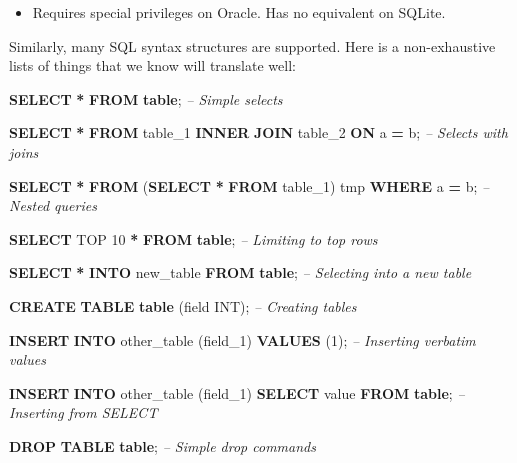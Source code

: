 \documentclass[
]{article}
\newenvironment{Shaded}{\begin{snugshade}}{\end{snugshade}}
\newcommand{\CommentTok}[1]{\textcolor[rgb]{0.56,0.35,0.01}{\textit{#1}}}
\newcommand{\DataTypeTok}[1]{\textcolor[rgb]{0.13,0.29,0.53}{#1}}
\newcommand{\DecValTok}[1]{\textcolor[rgb]{0.00,0.00,0.81}{#1}}
\newcommand{\FunctionTok}[1]{\textcolor[rgb]{0.00,0.00,0.00}{#1}}
\newcommand{\KeywordTok}[1]{\textcolor[rgb]{0.13,0.29,0.53}{\textbf{#1}}}
\newcommand{\NormalTok}[1]{#1}
\newcommand{\OperatorTok}[1]{\textcolor[rgb]{0.81,0.36,0.00}{\textbf{#1}}}
\providecommand{\tightlist}{%
  \setlength{\itemsep}{0pt}\setlength{\parskip}{0pt}}
\begin{document}
\begin{itemize}
\tightlist
\item
  Requires special privileges on Oracle. Has no equivalent on SQLite.
\end{itemize}

Similarly, many SQL syntax structures are supported. Here is a
non-exhaustive lists of things that we know will translate well:

\begin{Shaded}
\begin{Highlighting}[]
\KeywordTok{SELECT} \OperatorTok{*} \KeywordTok{FROM} \KeywordTok{table}\NormalTok{;                                        }\CommentTok{-- Simple selects}

\KeywordTok{SELECT} \OperatorTok{*} \KeywordTok{FROM}\NormalTok{ table_1 }\KeywordTok{INNER} \KeywordTok{JOIN}\NormalTok{ table_2 }\KeywordTok{ON}\NormalTok{ a }\OperatorTok{=}\NormalTok{ b;          }\CommentTok{-- Selects with joins }

\KeywordTok{SELECT} \OperatorTok{*} \KeywordTok{FROM}\NormalTok{ (}\KeywordTok{SELECT} \OperatorTok{*} \KeywordTok{FROM}\NormalTok{ table_1) tmp }\KeywordTok{WHERE}\NormalTok{ a }\OperatorTok{=}\NormalTok{ b;      }\CommentTok{-- Nested queries}

\KeywordTok{SELECT}\NormalTok{ TOP }\DecValTok{10} \OperatorTok{*} \KeywordTok{FROM} \KeywordTok{table}\NormalTok{;                                 }\CommentTok{-- Limiting to top rows}

\KeywordTok{SELECT} \OperatorTok{*} \KeywordTok{INTO}\NormalTok{ new_table }\KeywordTok{FROM} \KeywordTok{table}\NormalTok{;                         }\CommentTok{-- Selecting into a new table}

\KeywordTok{CREATE} \KeywordTok{TABLE} \KeywordTok{table}\NormalTok{ (field }\DataTypeTok{INT}\NormalTok{);                             }\CommentTok{-- Creating tables}

\KeywordTok{INSERT} \KeywordTok{INTO}\NormalTok{ other_table (field_1) }\KeywordTok{VALUES}\NormalTok{ (}\DecValTok{1}\NormalTok{);               }\CommentTok{-- Inserting verbatim values           }

\KeywordTok{INSERT} \KeywordTok{INTO}\NormalTok{ other_table (field_1) }\KeywordTok{SELECT} \FunctionTok{value} \KeywordTok{FROM} \KeywordTok{table}\NormalTok{;  }\CommentTok{-- Inserting from SELECT}
  
\KeywordTok{DROP} \KeywordTok{TABLE} \KeywordTok{table}\NormalTok{;                                           }\CommentTok{-- Simple drop commands}


\end{Highlighting}
\end{Shaded}
\end{document}
